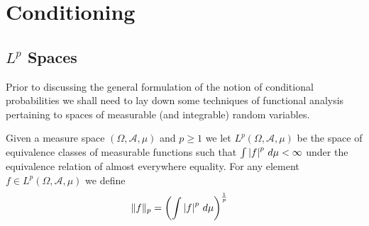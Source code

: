 \section{Conditioning}

\subsection{$L^p$ Spaces}
Prior to discussing the general formulation of the notion of
conditional probabilities we shall need to lay down some techniques of
functional analysis pertaining to spaces of measurable (and
integrable) random variables.

\begin{defn}Given a measure space $(\Omega, \mathcal{A}, \mu)$ and $p
  \geq 1$ we let $L^p(\Omega, \mathcal{A}, \mu)$ be the space of equivalence
  classes of measurable functions such that $\int \left \vert f \right \vert^p \, d\mu <
  \infty$ under the equivalence relation of
  almost everywhere equality.  For any element $f \in   L^p(\Omega,
  \mathcal{A}, \mu)$ we define 
\begin{align*}
\lVert f \rVert_p &= \left ( \int \left \vert f \right \vert^p \, d\mu \right )^{\frac{1}{p}}
\end{align*}
\end{defn}

